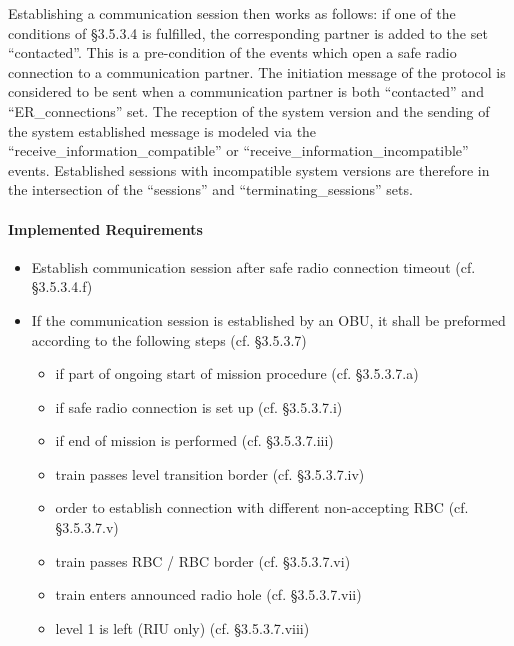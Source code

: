 \documentclass{template/openetcs_article}
\begin{document}
Establishing a communication session then works as follows: if one of the
conditions of §3.5.3.4 is fulfilled, the corresponding partner is added to the
set ``contacted''. This is a pre-condition of the events which open a safe radio
connection to a communication partner. The initiation message of the protocol is
considered to be sent when a communication partner is both ``contacted'' and
``ER\_connections'' set. The reception of the system version and the sending of
the system established message is modeled via the
``receive\_information\_compatible'' or ``receive\_information\_incompatible''
events. Established sessions with incompatible system versions are therefore in
the intersection of the ``sessions'' and ``terminating\_sessions'' sets.

\paragraph{Implemented Requirements}
\label{sec:impl-requ-4}

\begin{itemize}
\item Establish communication session after safe radio connection timeout
  (cf. §3.5.3.4.f)
\item If the communication session is established by an OBU, it shall be
  preformed according to the following steps (cf. §3.5.3.7)
  \begin{itemize}
  \item if part of ongoing start of mission procedure (cf. §3.5.3.7.a)
  \item if safe radio connection is set up (cf. §3.5.3.7.i)
  \item if end of mission is performed (cf. §3.5.3.7.iii)
  \item train passes level transition border (cf. §3.5.3.7.iv)
  \item order to establish connection with different non-accepting RBC
    (cf. §3.5.3.7.v)
  \item train passes RBC / RBC border (cf. §3.5.3.7.vi)
  \item train enters announced radio hole (cf. §3.5.3.7.vii)
  \item level 1 is left (RIU only) (cf. §3.5.3.7.viii)
  \end{itemize}
\end{itemize}


\end{document}
